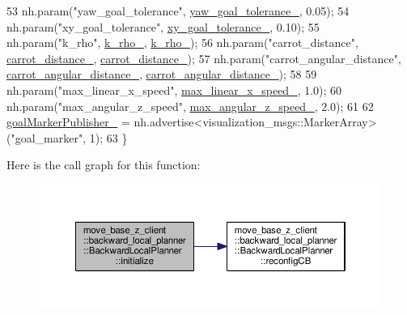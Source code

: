 \begin{DoxyCode}
53     nh.param(\textcolor{stringliteral}{"yaw\_goal\_tolerance"}, \hyperlink{classmove__base__z__client_1_1backward__local__planner_1_1BackwardLocalPlanner_a10d15842054d518159baa535afe6f1fd}{yaw\_goal\_tolerance\_}, 0.05);
54     nh.param(\textcolor{stringliteral}{"xy\_goal\_tolerance"}, \hyperlink{classmove__base__z__client_1_1backward__local__planner_1_1BackwardLocalPlanner_a89ab1ee7283a474dc19970789f51c087}{xy\_goal\_tolerance\_}, 0.10);
55     nh.param(\textcolor{stringliteral}{"k\_rho"}, \hyperlink{classmove__base__z__client_1_1backward__local__planner_1_1BackwardLocalPlanner_a9ae9a8c4c4663a999ba107aea9f6868d}{k\_rho\_}, \hyperlink{classmove__base__z__client_1_1backward__local__planner_1_1BackwardLocalPlanner_a9ae9a8c4c4663a999ba107aea9f6868d}{k\_rho\_});
56     nh.param(\textcolor{stringliteral}{"carrot\_distance"}, \hyperlink{classmove__base__z__client_1_1backward__local__planner_1_1BackwardLocalPlanner_a6dc3aa0ff63f9f7d0aae852755734b5d}{carrot\_distance\_}, 
      \hyperlink{classmove__base__z__client_1_1backward__local__planner_1_1BackwardLocalPlanner_a6dc3aa0ff63f9f7d0aae852755734b5d}{carrot\_distance\_});
57     nh.param(\textcolor{stringliteral}{"carrot\_angular\_distance"}, \hyperlink{classmove__base__z__client_1_1backward__local__planner_1_1BackwardLocalPlanner_a3d6cba0748b85a67f5dfd7740de9530f}{carrot\_angular\_distance\_}, 
      \hyperlink{classmove__base__z__client_1_1backward__local__planner_1_1BackwardLocalPlanner_a3d6cba0748b85a67f5dfd7740de9530f}{carrot\_angular\_distance\_});
58 
59     nh.param(\textcolor{stringliteral}{"max\_linear\_x\_speed"}, \hyperlink{classmove__base__z__client_1_1backward__local__planner_1_1BackwardLocalPlanner_a287325b11b5eb8a76b6924b42f859e25}{max\_linear\_x\_speed\_}, 1.0);
60     nh.param(\textcolor{stringliteral}{"max\_angular\_z\_speed"}, \hyperlink{classmove__base__z__client_1_1backward__local__planner_1_1BackwardLocalPlanner_a8b5cbc273dfcf1c5e15ac4475b45ca97}{max\_angular\_z\_speed\_}, 2.0);
61 
62     \hyperlink{classmove__base__z__client_1_1backward__local__planner_1_1BackwardLocalPlanner_a7228d3fe90bc48b486e5c46d6ac5e815}{goalMarkerPublisher\_} = nh.advertise<visualization\_msgs::MarkerArray>(\textcolor{stringliteral}{"goal\_marker"},
       1);
63 \}
\end{DoxyCode}


Here is the call graph for this function\+:\nopagebreak
\begin{figure}[H]
\begin{center}
\leavevmode
\includegraphics[width=350pt]{classmove__base__z__client_1_1backward__local__planner_1_1BackwardLocalPlanner_acdb083587fd77dc2c8d617751ac08f74_cgraph}
\end{center}
\end{figure}




